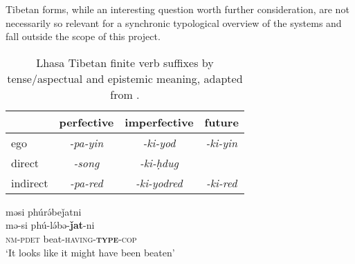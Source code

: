 Tibetan forms, while an interesting question worth further consideration, are not necessarily so relevant for a synchronic typological overview of the systems and fall outside the scope of this project. 

\begin{table}
        \caption{Lhasa Tibetan finite verb suffixes by tense/aspectual and epistemic meaning, adapted from .}\label{t:Description:LhasaTibetanFinite}
        \begin{tabular}{l|c|c|c}
         & perfective       & imperfective         & future           \\ \hline
        ego                  & \textit{-pa-yin} & \textit{-ki-yod}     & \textit{-ki-yin} \\
        direct               & \textit{-song}   & \textit{-ki-ḥdug}    & \textit{}        \\
        indirect             & \textit{-pa-red} & \textit{-ki-yodred} & \textit{-ki-red}
        \end{tabular}

\end{table}

\begin{exe}
        \ex\label{e:Description:MeitheiNominaliser}
        \glll məsi phúrə́beǰatni \\
        mə-si phú-lə́bə-\textbf{ǰat}-ni \\
        \textsc{nm-pdet} beat-\textsc{having-\textbf{type}-cop} \\
        \glt `It looks like it might have been beaten' \\
        \cite[Meithei,][296]{Chelliah1997}
\end{exe}

